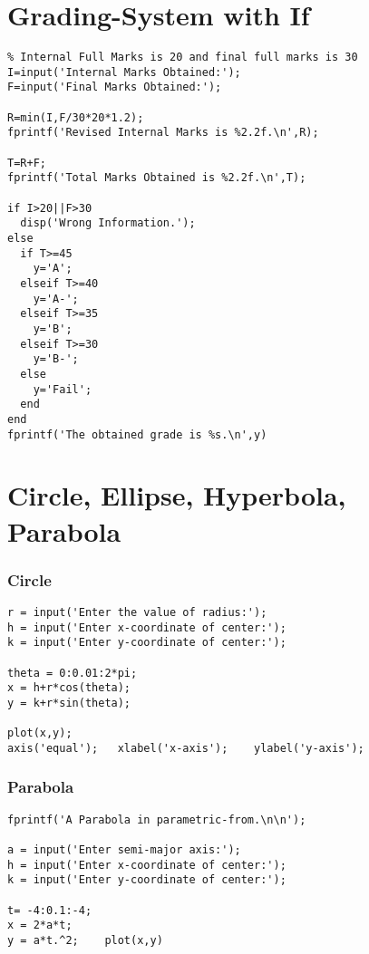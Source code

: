 \chapter{Grading-System with If}

\begin{verbatim}
% Internal Full Marks is 20 and final full marks is 30
I=input('Internal Marks Obtained:');
F=input('Final Marks Obtained:');

R=min(I,F/30*20*1.2);
fprintf('Revised Internal Marks is %2.2f.\n',R);

T=R+F;
fprintf('Total Marks Obtained is %2.2f.\n',T);

if I>20||F>30
  disp('Wrong Information.');
else
  if T>=45
    y='A';
  elseif T>=40
    y='A-';
  elseif T>=35
    y='B';
  elseif T>=30
    y='B-';
  else
    y='Fail';
  end
end
fprintf('The obtained grade is %s.\n',y)

\end{verbatim}
\clearpage

\chapter{Circle, Ellipse, Hyperbola, Parabola}

\subsection{Circle}
\begin{verbatim}
r = input('Enter the value of radius:');
h = input('Enter x-coordinate of center:');
k = input('Enter y-coordinate of center:');

theta = 0:0.01:2*pi;
x = h+r*cos(theta);
y = k+r*sin(theta);

plot(x,y);
axis('equal');   xlabel('x-axis');    ylabel('y-axis');
\end{verbatim}

\subsection{Parabola}
\begin{verbatim}
fprintf('A Parabola in parametric-from.\n\n');

a = input('Enter semi-major axis:');
h = input('Enter x-coordinate of center:');
k = input('Enter y-coordinate of center:');

t= -4:0.1:-4;
x = 2*a*t;
y = a*t.^2;    plot(x,y)
\end{verbatim}
\clearpage

